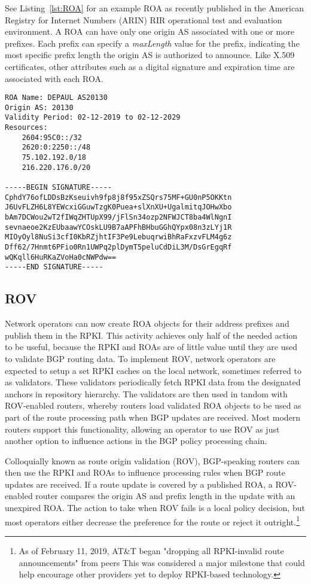 \documentclass[sigconf]{acmart}
\begin{document}
See Listing~\ref{lst:ROA} for an example ROA as recently published in
the American Registry for Internet Numbers (ARIN) RIR operational test
and evaluation environment.  A ROA can have only one origin AS
associated with one or more prefixes.  Each prefix can specify a
\emph{maxLength} value for the prefix, indicating the most specific
prefix length the origin AS is authorized to announce.  Like X.509
certificates, other attributes such as a digital signature and
expiration time are associated with each ROA.

\begin{lstlisting}[float,basicstyle=\footnotesize\ttfamily,caption={Example AS 20130 ROA},label={lst:ROA}]
ROA Name: DEPAUL AS20130
Origin AS: 20130
Validity Period: 02-12-2019 to 02-12-2029
Resources:
    2604:95C0::/32
    2620:0:2250::/48
    75.102.192.0/18
    216.220.176.0/20

-----BEGIN SIGNATURE-----
CphdY76ofLDDsBzKseuivh9fp8j8f95xZSQrs75MF+GU0nP5OKKtn
J6UvFLZH6L8YEWcxiGGuwTzgK0Puea+slXnXU+UgalmitqJOHwXbo
bAm7DCWou2wT2fIWqZHTUpX99/jFlSn34ozp2NFWJCT8ba4WlNgnI
sevnaeoe2KzEUbaawYCOskLU9B7aAPFhBHbuGGhQYpx08n3zLYj1R
MIOyOyl8NuSi3cfI0KbRZjhtIF3Pe9LebuqrwiBhRaFxzvFLM4g6z
Dff62/7Hnmt6PFio0Rn1UWPq2plDymT5peluCdDiL3M/DsGrEgqRf
wQKqll6HuRKaZVoHa0cNWPdw==
-----END SIGNATURE-----
\end{lstlisting}

\subsection{ROV}

Network operators can now create ROA objects for their address prefixes
and publish them in the RPKI.  This activity achieves only half of the
needed action to be useful, because the RPKI and ROAs are of little
value until they are used to validate BGP routing data.  To implement
ROV, network operators are expected to setup a set RPKI caches on the
local network, sometimes referred to as validators.  These validators
periodically fetch RPKI data from the designated anchors in repository
hierarchy.  The validators are then used in tandom with ROV-enabled
routers, whereby routers load validated ROA objects to be used as part
of the route processing path when BGP updates are received.  Most modern
routers support this functionality, allowing an operator to use ROV as
just another option to influence actions in the BGP policy processing
chain.

Colloquially known as route origin validation (ROV), BGP-speaking
routers can then use the RPKI and ROAs to influence processing rules
when BGP route updates are received.\cite{bush_origin_2014}  If a route
update is covered by a published ROA, a ROV-enabled router compares the
origin AS and prefix length in the update with an unexpired ROA.  The
action to take when ROV fails is a local policy decision, but most
operators either decrease the preference for the route or reject it
outright.\footnote{As of February 11, 2019, AT\&T began "dropping all
RPKI-invalid route announcements" from
peers\cite{borkenhagen_at&t/as7018_2019}  This was considered a major
milestone that could help encourage other providers yet to deploy
RPKI-based technology.}
\end{document}
